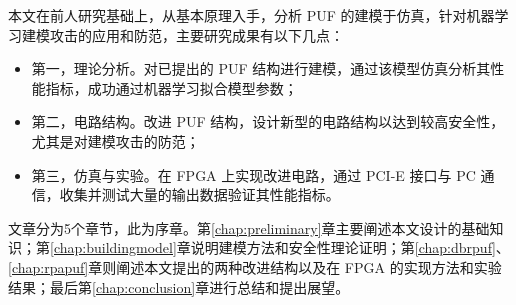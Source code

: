 本文在前人研究基础上，从基本原理入手，分析 PUF 的建模于仿真，针对机器学习建模攻击的应用和防范，主要研究成果有以下几点：
\begin{itemize}
\item 第一，理论分析。对已提出的 PUF 结构进行建模，通过该模型仿真分析其性能指标，成功通过机器学习拟合模型参数；
\item 第二，电路结构。改进 PUF 结构，设计新型的电路结构以达到较高安全性，尤其是对建模攻击的防范；
\item 第三，仿真与实验。在 FPGA 上实现改进电路，通过 PCI-E 接口与 PC 通信，收集并测试大量的输出数据验证其性能指标。
\end{itemize}

文章分为5个章节，此为序章。第\ref{chap:preliminary}章主要阐述本文设计的基础知识；第\ref{chap:buildingmodel}章说明建模方法和安全性理论证明；第\ref{chap:dbrpuf}、\ref{chap:rpapuf}章则阐述本文提出的两种改进结构以及在 FPGA 的实现方法和实验结果；最后第\ref{chap:conclusion}章进行总结和提出展望。

